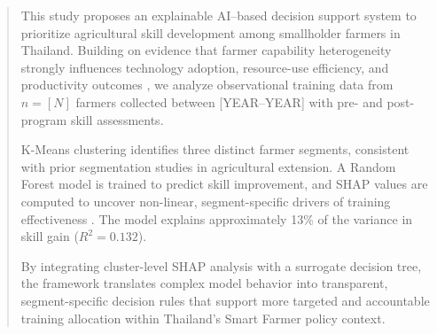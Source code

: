 \begin{abstract}
This study proposes an explainable AI–based decision support system to prioritize agricultural skill development among smallholder farmers in Thailand. Building on evidence that farmer capability heterogeneity strongly influences technology adoption, resource-use efficiency, and productivity outcomes \citep{feder1985adoption, davis2012impact}, we analyze observational training data from $n = [N]$ farmers collected between [YEAR--YEAR] with pre- and post-program skill assessments. 

K-Means clustering identifies three distinct farmer segments, consistent with prior segmentation studies in agricultural extension. A Random Forest model is trained to predict skill improvement, and SHAP values are computed to uncover non-linear, segment-specific drivers of training effectiveness \citep{adadi2018xai, molnar2022interpretable}. The model explains approximately 13\% of the variance in skill gain ($R^2 = 0.132$). 

By integrating cluster-level SHAP analysis with a surrogate decision tree, the framework translates complex model behavior into transparent, segment-specific decision rules that support more targeted and accountable training allocation within Thailand’s Smart Farmer policy context.
\end{abstract}
